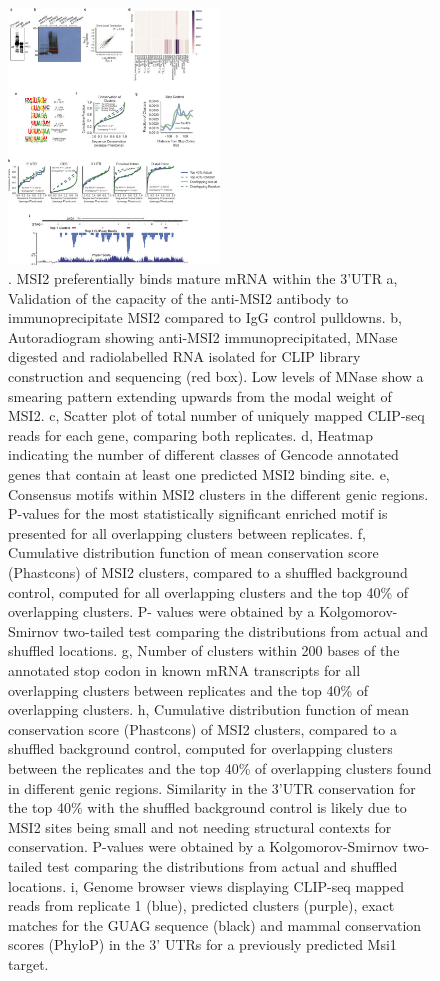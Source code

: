 \begin{figure}[ht]
  \centering
  \includegraphics[width=0.5\textwidth]{chapter_4_figures/Figure_S9}
  \caption[Supplementary Figure 3]{. MSI2 preferentially binds mature mRNA within the 3'UTR a, Validation of the capacity of the anti-MSI2 antibody to immunoprecipitate MSI2 compared to IgG control pulldowns. b, Autoradiogram showing anti-MSI2 immunoprecipitated, MNase digested and radiolabelled RNA isolated for CLIP library construction and sequencing (red box). Low levels of MNase show a smearing pattern extending upwards from the modal weight of MSI2. c, Scatter plot of total number of uniquely mapped CLIP-seq reads for each gene, comparing both replicates. d, Heatmap indicating the number of different classes of Gencode annotated genes that contain at least one predicted MSI2 binding site. e, Consensus motifs within MSI2 clusters in the different genic regions. P-values for the most statistically significant enriched motif is presented for all overlapping clusters between replicates. f, Cumulative distribution function of mean conservation score (Phastcons) of MSI2 clusters, compared to a shuffled background control, computed for all overlapping clusters and the top 40\% of overlapping clusters. P- values were obtained by a Kolgomorov-Smirnov two-tailed test comparing the distributions from actual and shuffled locations. g, Number of clusters within 200 bases of the annotated stop codon in known mRNA transcripts for all overlapping clusters between replicates and the top 40\% of overlapping clusters. h, Cumulative distribution function of mean conservation score (Phastcons) of MSI2 clusters, compared to a shuffled background control, computed for overlapping clusters between the replicates and the top 40\% of overlapping clusters found in different genic regions. Similarity in the 3'UTR conservation for the top 40\% with the shuffled background control is likely due to MSI2 sites being small and not needing structural contexts for conservation. P-values were obtained by a Kolgomorov-Smirnov two-tailed test comparing the distributions from actual and shuffled locations. i, Genome browser views displaying CLIP-seq mapped reads from replicate 1 (blue), predicted clusters (purple), exact matches for the GUAG sequence (black) and mammal conservation scores (PhyloP) in the 3' UTRs for a previously predicted Msi1 target. }
  \label{fig:Figure_S3}
\end{figure}

